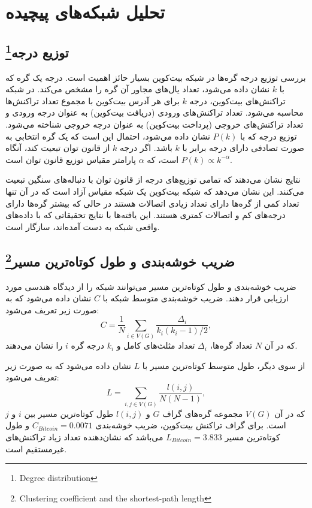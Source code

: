 \chapter{تحلیل شبکه‌های پیچیده}
\section{توزیع درجه\footnote{Degree distribution}}
بررسی توزیع درجه گره‌ها در شبکه بیت‌کوین بسیار حائز اهمیت است. درجه یک گره که با \(k\) نشان داده می‌شود، تعداد یال‌های مجاور آن گره را مشخص می‌کند. در شبکه تراکنش‌های بیت‌کوین، درجه \(k\) برای هر آدرس بیت‌کوین با مجموع تعداد تراکنش‌ها محاسبه می‌شود. تعداد تراکنش‌های ورودی (دریافت بیت‌کوین) به عنوان درجه ورودی و تعداد تراکنش‌های خروجی (پرداخت بیت‌کوین) به عنوان درجه خروجی شناخته می‌شود. توزیع درجه که با \(P(k)\) نشان داده می‌شود، احتمال این است که یک گره انتخابی به صورت تصادفی دارای درجه برابر با \(k\) باشد. اگر درجه \(k\) از قانون توان تبعیت کند، آنگاه \(P(k) \propto k^{-\alpha}\) است، که \(\alpha\) پارامتر مقیاس توزیع قانون توان است.

نتایج نشان می‌دهند که تمامی توزیع‌های درجه از قانون توان با دنباله‌های سنگین تبعیت می‌کنند. این نشان می‌دهد که شبکه بیت‌کوین یک شبکه مقیاس آزاد است که در آن تنها تعداد کمی از گره‌ها دارای تعداد زیادی اتصالات هستند در حالی که بیشتر گره‌ها دارای درجه‌های کم و اتصالات کمتری هستند. این یافته‌ها با نتایج تحقیقاتی که با داده‌های واقعی شبکه به دست آمده‌اند، سازگار است. 


\section{ضریب خوشه‌بندی و طول کوتاه‌ترین مسیر\footnote{Clustering coefficient and the shortest-path length}}

ضریب خوشه‌بندی و طول کوتاه‌ترین مسیر می‌توانند شبکه را از دیدگاه هندسی مورد ارزیابی قرار دهند. ضریب خوشه‌بندی متوسط شبکه با \(C\) نشان داده می‌شود که به صورت زیر تعریف می‌شود:
\[
C = \frac{1}{N} \sum_{i \in V(G)} \frac{\Delta_i}{k_i (k_i - 1) / 2},
\]
که در آن \(N\) تعداد گره‌ها، \(\Delta_i\) تعداد مثلث‌های کامل و \(k_i\) درجه گره \(i\) را نشان می‌دهند.

از سوی دیگر، طول متوسط کوتاه‌ترین مسیر با \(L\) نشان داده می‌شود که به صورت زیر تعریف می‌شود:
\[
L = \sum_{i,j \in V(G)}  \frac{l(i,j)}{N(N-1)},
\]
که در آن \(V(G)\) مجموعه گره‌های گراف \(G\) و \(l(i,j)\) طول کوتاه‌ترین مسیر بین \(i\) و \(j\) است. برای گراف تراکنش بیت‌کوین، ضریب خوشه‌بندی \(C_{Bitcoin} = 0.0071\) و طول کوتاه‌ترین مسیر \(L_{Bitcoin} = 3.833\) می‌باشد که نشان‌دهنده تعداد زیاد تراکنش‌های غیرمستقیم است.

